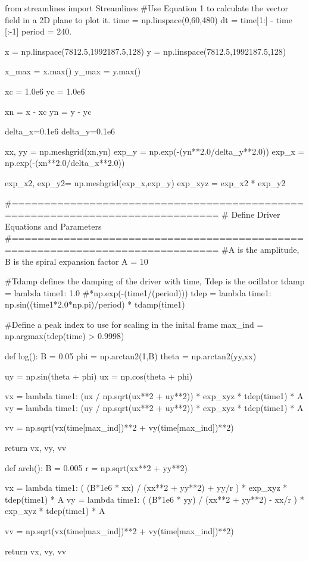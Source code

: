 \begin{pycode}[chapter4]
from streamlines import Streamlines
#Use Equation 1 to calculate the vector field in a 2D plane to plot it.
time = np.linspace(0,60,480)
dt = time[1:] - time [:-1]
period = 240.

x = np.linspace(7812.5,1992187.5,128)
y = np.linspace(7812.5,1992187.5,128)

x_max = x.max()
y_max = y.max()

xc = 1.0e6
yc = 1.0e6

xn = x - xc
yn = y - yc

delta_x=0.1e6
delta_y=0.1e6

xx, yy = np.meshgrid(xn,yn)
exp_y = np.exp(-(yn**2.0/delta_y**2.0))
exp_x = np.exp(-(xn**2.0/delta_x**2.0))

exp_x2, exp_y2= np.meshgrid(exp_x,exp_y)
exp_xyz = exp_x2 * exp_y2


#==============================================================================
# Define Driver Equations and Parameters
#==============================================================================
#A is the amplitude, B is the spiral expansion factor
A = 10

#Tdamp defines the damping of the driver with time, Tdep is the ocillator
tdamp = lambda time1: 1.0 #*np.exp(-(time1/(period)))
tdep = lambda time1: np.sin((time1*2.0*np.pi)/period) * tdamp(time1)

#Define a peak index to use for scaling in the inital frame
max_ind = np.argmax(tdep(time) > 0.9998)

def log():
	B = 0.05
	phi = np.arctan2(1,B)
	theta = np.arctan2(yy,xx)
	
	uy = np.sin(theta + phi)
	ux =  np.cos(theta + phi)
	
	vx = lambda time1: (ux / np.sqrt(ux**2 + uy**2)) * exp_xyz * tdep(time1) * A
	vy = lambda time1: (uy / np.sqrt(ux**2 + uy**2)) * exp_xyz * tdep(time1) * A
	
	vv = np.sqrt(vx(time[max_ind])**2 + vy(time[max_ind])**2)
	
	return vx, vy, vv

def arch():
	B = 0.005
	r = np.sqrt(xx**2 + yy**2)
	
	vx = lambda time1: ( (B*1e6 * xx) / (xx**2 + yy**2) + yy/r ) * exp_xyz * tdep(time1) * A
	vy = lambda time1: ( (B*1e6 * yy) / (xx**2 + yy**2) - xx/r ) * exp_xyz * tdep(time1) * A
	
	vv = np.sqrt(vx(time[max_ind])**2 + vy(time[max_ind])**2)
	
	return vx, vy, vv


\end{pycode}
